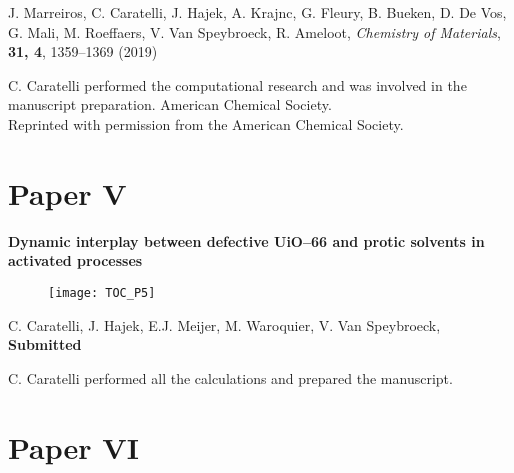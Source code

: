 \noindent
J. Marreiros, C. Caratelli, J. Hajek, A. Krajnc, G. Fleury, B. Bueken, D. De Vos, G. Mali, M. Roeffaers, V. Van Speybroeck, R. Ameloot, \textit{Chemistry of Materials}, \textbf{31, 4}, 1359--1369
(2019)

\vfill

\noindent C. Caratelli performed the computational research and was involved in the manuscript preparation.
\npar
\noindent {} American Chemical Society. \\
Reprinted with permission from the American Chemical Society.

\clearpage{\pagestyle{empty}\cleardoublepage}
% 
\clearpage{\pagestyle{empty}\cleardoublepage}


\section*{Paper V}

\vspace{0.1\textheight}
{
\large
\textbf{Dynamic interplay between defective UiO--66 and protic solvents in activated processes} }
\begin{figure}[h!]
	\centering
	\texttt{[image: TOC\_P5]}
\end{figure}
 
\noindent
C. Caratelli, J. Hajek, E.J. Meijer, M. Waroquier, V. Van Speybroeck, \textbf{Submitted}

\vfill

\noindent C. Caratelli performed all the calculations and prepared the manuscript.
\npar

\clearpage{\pagestyle{empty}\cleardoublepage}
% 
\clearpage{\pagestyle{empty}\cleardoublepage}

\section*{Paper VI}

